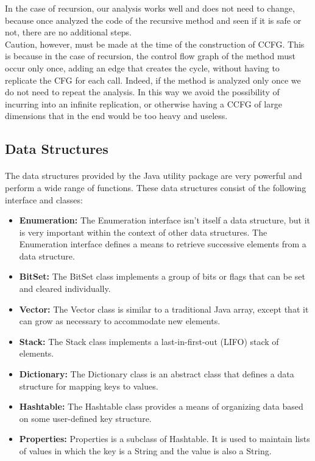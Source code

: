 \documentclass[letterpaper,twocolumn,10pt]{article}
\begin{document}
In the case of recursion, our analysis works well and does not need to change, because once analyzed the code of the recursive method and seen if it is safe or not, there are no additional steps.\\
Caution, however, must be made at the time of the construction of CCFG. This is because in the case of recursion, the control flow graph of the method must occur only once, adding an edge that creates the cycle, without having to replicate the CFG for each call. Indeed, if the method is analyzed only once we do not need to repeat the analysis. In this way we avoid the possibility of incurring into an infinite replication, or otherwise having a CCFG of large dimensions that in the end would be too heavy and useless.

\subsection{Data Structures}
\paragraph{}
The data structures provided by the Java utility package are very powerful and perform a wide range of functions. These data structures consist of the following interface and classes:

\begin{itemize}
\item \textbf{Enumeration:} The Enumeration interface isn't itself a data structure, but it is very important within the context of other data structures. The Enumeration interface defines a means to retrieve successive elements from a data structure.
\item \textbf{BitSet:} The BitSet class implements a group of bits or flags that can be set and cleared individually.
\item \textbf{Vector:} The Vector class is similar to a traditional Java array, except that it can grow as necessary to accommodate new elements.
\item \textbf{Stack:} The Stack class implements a last-in-first-out (LIFO) stack of elements.
\item \textbf{Dictionary:} The Dictionary class is an abstract class that defines a data structure for mapping keys to values.
\item \textbf{Hashtable:} The Hashtable class provides a means of organizing data based on some user-defined key structure.
\item \textbf{Properties:} Properties is a subclass of Hashtable. It is used to maintain lists of values in which the key is a String and the value is also a String.
\end{itemize}
\end{document}
